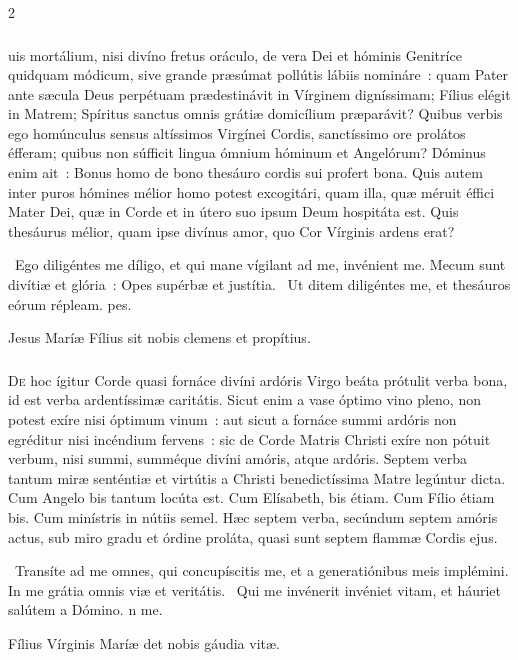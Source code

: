 \documentclass[9pt,twoside]{extarticle}
\begin{document}
\begin{multicols}{2}
\subsubsection*{\center {}}
uis mortálium, nisi divíno fretus oráculo, de vera Dei et hóminis Genitríce quidquam módicum, sive grande præsúmat pollútis lábiis nomináre~: quam Pater ante sæcula Deus perpétuam prædestinávit in Vírginem digníssimam; Fílius elégit in Matrem; Spíritus sanctus omnis grátiæ domicílium præparávit? Quibus verbis ego homúnculus sensus altíssimos Virgínei Cordis, sanctíssimo ore prolátos éfferam; quibus non súfficit lingua ómnium hóminum et Angelórum? Dóminus enim ait~: Bonus homo de bono thesáuro cordis sui profert bona. Quis autem inter puros hómines mélior homo potest excogitári, quam illa, quæ méruit éffici Mater Dei, quæ in Corde et in útero suo ipsum Deum hospitáta est. Quis thesáurus mélior, quam ipse divínus amor, quo Cor Vírginis ardens erat?

\begin{tightlist}{}
\item {}~Ego diligéntes me díligo, et qui mane vígilant ad me, invénient me. Mecum sunt divítiæ et glória~: \textred{*} Opes supérbæ et justítia. ~Ut ditem diligéntes me, et thesáuros eórum répleam. pes.
\item {} Jesus Maríæ Fílius sit nobis clemens et propítius.
\end{tightlist}

\subsubsection*{\center {}}
\lettrine{D}e hoc ígitur Corde quasi fornáce divíni ardóris Virgo beáta prótulit verba bona, id est verba ardentíssimæ caritátis. Sicut enim a vase óptimo vino pleno, non potest exíre nisi óptimum vinum~: aut sicut a fornáce summi ardóris non egréditur nisi incéndium fervens~: sic de Corde Matris Christi exíre non pótuit verbum, nisi summi, summéque divíni amóris, atque ardóris. Septem verba tantum miræ senténtiæ et virtútis a Christi benedictíssima Matre legúntur dicta. Cum Angelo bis tantum locúta est. Cum Elísabeth, bis étiam. Cum Fílio étiam bis. Cum minístris in nútiis semel. Hæc septem verba, secúndum septem amóris actus, sub miro gradu et órdine proláta, quasi sunt septem flammæ Cordis ejus.


\begin{tightlist}{}
\item {}~Transíte ad me omnes, qui concupíscitis me, et a generatiónibus meis implémini. \textred{*} In me grátia omnis viæ et veritátis. ~Qui me invénerit invéniet vitam, et háuriet salútem a Dómino. n me.
\item {} Fílius Vírginis Maríæ det nobis gáudia vitæ.
\end{tightlist}


\end{multicols}
\end{document}
